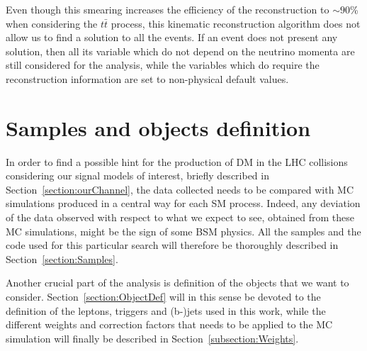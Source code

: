 \documentclass[a4paper, 10pt, openright]{report}
\begin{document}
Even though this smearing increases the efficiency of the reconstruction to $\sim 90$\% when considering the $t \bar t$ process, this kinematic reconstruction algorithm does not allow us to find a solution to all the events. If an event does not present any solution, then all its variable which do not depend on the neutrino momenta are still considered for the analysis, while the variables which do require the reconstruction information are set to non-physical default values. %

























\chapter{Samples and objects definition} \label{chapter:Samples}

In order to find a possible hint for the production of \ac{DM} in the \ac{LHC} collisions considering our signal models of interest, briefly described in Section~\ref{section:ourChannel}, the data collected needs to be compared with \acf{MC} simulations produced in a central way for each \ac{SM} process. Indeed, any deviation of the data observed with respect to what we expect to see, obtained from these \ac{MC} simulations, might be the sign of some \ac{BSM} physics. All the samples and the code used for this particular search will therefore be thoroughly described in Section~\ref{section:Samples}.

Another crucial part of the analysis is definition of the objects that we want to consider. Section~\ref{section:ObjectDef} will in this sense be devoted to the definition of the leptons, triggers and (b-)jets used in this work, while the different weights and correction factors that needs to be applied to the \ac{MC} simulation will finally be described in Section~\ref{subsection:Weights}.

\end{document}
